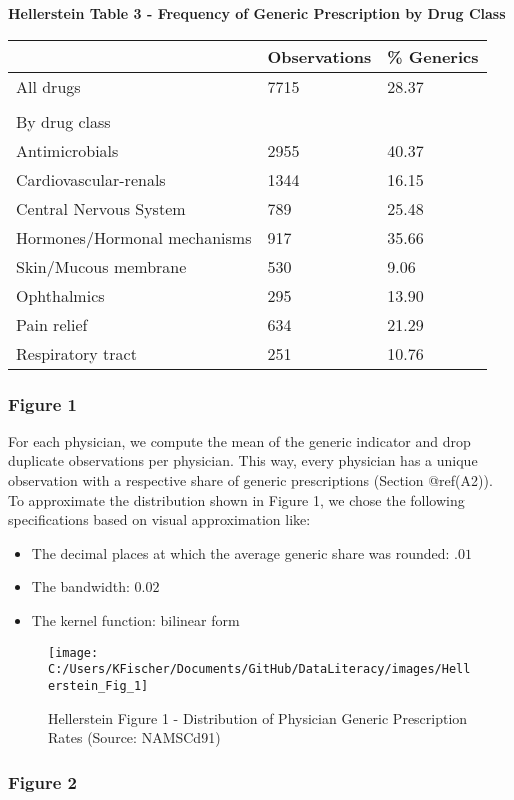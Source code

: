 \documentclass[
]{book}
\providecommand{\tightlist}{%
  \setlength{\itemsep}{0pt}\setlength{\parskip}{0pt}}
\begin{document}
\textbf{Hellerstein Table 3 - Frequency of Generic Prescription by Drug
Class}

\begin{longtable}[]{@{}lll@{}}
\toprule
& Observations & \% Generics\tabularnewline
\midrule
\endhead
All drugs & 7715 & 28.37\tabularnewline
& &\tabularnewline
By drug class & &\tabularnewline
Antimicrobials & 2955 & 40.37\tabularnewline
Cardiovascular-renals & 1344 & 16.15\tabularnewline
Central Nervous System & 789 & 25.48\tabularnewline
Hormones/Hormonal mechanisms & 917 & 35.66\tabularnewline
Skin/Mucous membrane & 530 & 9.06\tabularnewline
Ophthalmics & 295 & 13.90\tabularnewline
Pain relief & 634 & 21.29\tabularnewline
Respiratory tract & 251 & 10.76\tabularnewline
\bottomrule
\end{longtable}

\hypertarget{figure-1}{%
\subsubsection{Figure 1}\label{figure-1}}

For each physician, we compute the mean of the generic indicator and
drop duplicate observations per physician. This way, every physician has
a unique observation with a respective share of generic prescriptions
(Section @ref(A2)). To approximate the distribution shown in Figure 1,
we chose the following specifications based on visual approximation
like:

\begin{itemize}
\tightlist
\item
  The decimal places at which the average generic share was rounded:
  \(.01\)
\item
  The bandwidth: \(0.02\)
\item
  The kernel function: bilinear form
\end{itemize}

\begin{figure}

{\centering \texttt{[image: C:/Users/KFischer/Documents/GitHub/DataLiteracy/images/Hellerstein\_Fig\_1]} 

}

\caption{Hellerstein Figure 1 - Distribution of Physician Generic Prescription Rates (Source: NAMSCd91)}\label{fig:HellFig1}
\end{figure}

\hypertarget{figure-2}{%
\subsubsection{Figure 2}\label{figure-2}}
\end{document}
